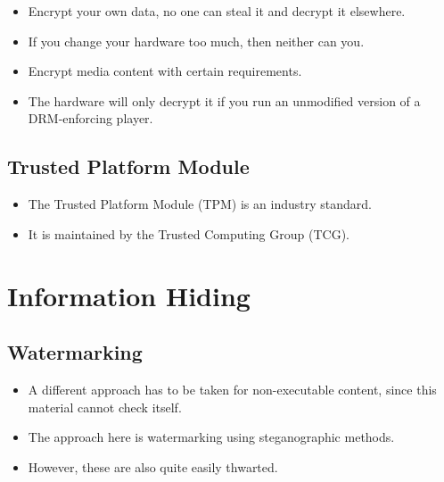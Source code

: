 \documentclass{beamer}
\begin{document}
\begin{frame}
  \begin{example}
    \begin{itemize}
      \item Encrypt your own data, no one can steal it and decrypt it 
        elsewhere.
      \item If you change your hardware too much, then neither can you.
    \end{itemize}
  \end{example}

  \pause{}

  \begin{example}
    \begin{itemize}
      \item Encrypt media content with certain requirements.
      \item The hardware will only decrypt it if you run an unmodified version 
        of a DRM-enforcing player.
    \end{itemize}
  \end{example}
\end{frame}

\subsection{Trusted Platform Module}

\begin{frame}
  \begin{itemize}
    \item The Trusted Platform Module (TPM) is an industry standard.
    \item It is maintained by the Trusted Computing Group (TCG).
  \end{itemize}
\end{frame}


\section{Information Hiding}

\subsection{Watermarking}

\begin{frame}
  \begin{itemize}
    \item A different approach has to be taken for non-executable content, 
      since this material cannot check itself.

    \item The approach here is watermarking using steganographic methods.

    \item However, these are also quite easily thwarted.
  \end{itemize}
\end{frame}




\begin{frame}
  \small
  \printbibliography{}
\end{frame}
\end{document}

